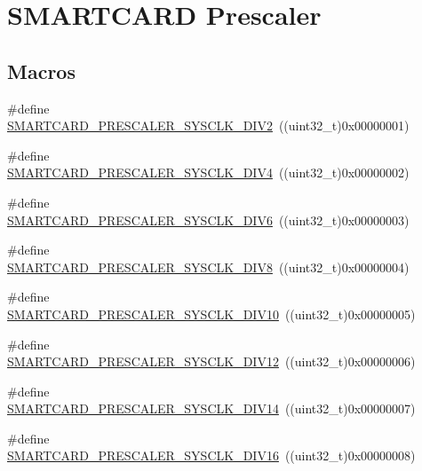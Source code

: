 \hypertarget{group___s_m_a_r_t_c_a_r_d___prescaler}{}\section{S\+M\+A\+R\+T\+C\+A\+RD Prescaler}
\label{group___s_m_a_r_t_c_a_r_d___prescaler}
\subsection*{Macros}
\begin{DoxyCompactItemize}
\item 
\#define \hyperlink{group___s_m_a_r_t_c_a_r_d___prescaler_ga518597171c45dce918b416ae36f75bfd}{S\+M\+A\+R\+T\+C\+A\+R\+D\+\_\+\+P\+R\+E\+S\+C\+A\+L\+E\+R\+\_\+\+S\+Y\+S\+C\+L\+K\+\_\+\+D\+I\+V2}~((uint32\+\_\+t)0x00000001)
\item 
\#define \hyperlink{group___s_m_a_r_t_c_a_r_d___prescaler_ga2c6ddf9cae4eaaaf5803f86fe087e069}{S\+M\+A\+R\+T\+C\+A\+R\+D\+\_\+\+P\+R\+E\+S\+C\+A\+L\+E\+R\+\_\+\+S\+Y\+S\+C\+L\+K\+\_\+\+D\+I\+V4}~((uint32\+\_\+t)0x00000002)
\item 
\#define \hyperlink{group___s_m_a_r_t_c_a_r_d___prescaler_ga88f3e7d9c23eaf8d9e76ec0931008815}{S\+M\+A\+R\+T\+C\+A\+R\+D\+\_\+\+P\+R\+E\+S\+C\+A\+L\+E\+R\+\_\+\+S\+Y\+S\+C\+L\+K\+\_\+\+D\+I\+V6}~((uint32\+\_\+t)0x00000003)
\item 
\#define \hyperlink{group___s_m_a_r_t_c_a_r_d___prescaler_gadb83b5369c269a9f45150ca135293ed4}{S\+M\+A\+R\+T\+C\+A\+R\+D\+\_\+\+P\+R\+E\+S\+C\+A\+L\+E\+R\+\_\+\+S\+Y\+S\+C\+L\+K\+\_\+\+D\+I\+V8}~((uint32\+\_\+t)0x00000004)
\item 
\#define \hyperlink{group___s_m_a_r_t_c_a_r_d___prescaler_ga2a31535a53476c53ad0b8862d47361a9}{S\+M\+A\+R\+T\+C\+A\+R\+D\+\_\+\+P\+R\+E\+S\+C\+A\+L\+E\+R\+\_\+\+S\+Y\+S\+C\+L\+K\+\_\+\+D\+I\+V10}~((uint32\+\_\+t)0x00000005)
\item 
\#define \hyperlink{group___s_m_a_r_t_c_a_r_d___prescaler_ga33f343132a4bff0acf68bcea5bb4359c}{S\+M\+A\+R\+T\+C\+A\+R\+D\+\_\+\+P\+R\+E\+S\+C\+A\+L\+E\+R\+\_\+\+S\+Y\+S\+C\+L\+K\+\_\+\+D\+I\+V12}~((uint32\+\_\+t)0x00000006)
\item 
\#define \hyperlink{group___s_m_a_r_t_c_a_r_d___prescaler_ga40d718d75474d7281eeed5a074a87c42}{S\+M\+A\+R\+T\+C\+A\+R\+D\+\_\+\+P\+R\+E\+S\+C\+A\+L\+E\+R\+\_\+\+S\+Y\+S\+C\+L\+K\+\_\+\+D\+I\+V14}~((uint32\+\_\+t)0x00000007)
\item 
\#define \hyperlink{group___s_m_a_r_t_c_a_r_d___prescaler_gacddac735f9f6508ddb1897465f4b2ff5}{S\+M\+A\+R\+T\+C\+A\+R\+D\+\_\+\+P\+R\+E\+S\+C\+A\+L\+E\+R\+\_\+\+S\+Y\+S\+C\+L\+K\+\_\+\+D\+I\+V16}~((uint32\+\_\+t)0x00000008)

\end{DoxyCompactItemize}
